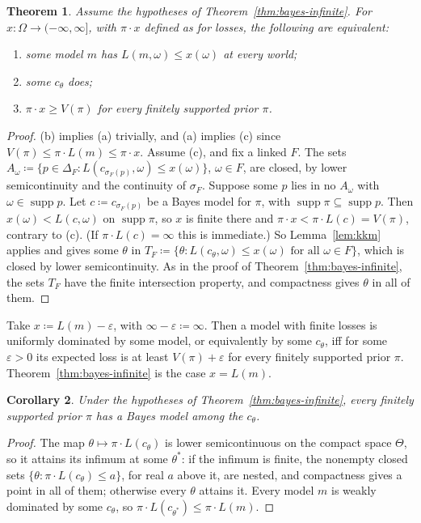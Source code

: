 \documentclass[11pt]{article}
\newtheorem{theorem}{Theorem}[section]
\newtheorem{corollary}[theorem]{Corollary}
\theoremstyle{definition}
\theoremstyle{remark}
\newcommand{\supp}{\operatorname{supp}}
\begin{document}
\begin{theorem}\label{thm:margin}
Assume the hypotheses of Theorem~\ref{thm:bayes-infinite}. For $x:\Omega\to(-\infty,\infty]$, with $\pi\cdot x$ defined as for losses, the following are equivalent:
\begin{enumerate}[label=(\alph*)]
\item some model $m$ has $L(m,\omega)\le x(\omega)$ at every world;
\item some $c_\theta$ does;
\item $\pi\cdot x\ge V(\pi)$ for every finitely supported prior $\pi$.
\end{enumerate}
\end{theorem}
\begin{proof}
(b) implies (a) trivially, and (a) implies (c) since $V(\pi)\le\pi\cdot L(m)\le\pi\cdot x$. Assume (c), and fix a linked $F$. The sets $A_\omega\coloneqq\{p\in\Delta_F:L(c_{\sigma_F(p)},\omega)\le x(\omega)\}$, $\omega\in F$, are closed, by lower semicontinuity and the continuity of $\sigma_F$. Suppose some $p$ lies in no $A_\omega$ with $\omega\in\supp p$. Let $c\coloneqq c_{\sigma_F(p)}$ be a Bayes model for $\pi$, with $\supp\pi\subseteq\supp p$. Then $x(\omega)<L(c,\omega)$ on $\supp\pi$, so $x$ is finite there and $\pi\cdot x<\pi\cdot L(c)=V(\pi)$, contrary to (c). (If $\pi\cdot L(c)=\infty$ this is immediate.) So Lemma~\ref{lem:kkm} applies and gives some $\theta$ in $T_F\coloneqq\{\theta:L(c_\theta,\omega)\le x(\omega)\text{ for all }\omega\in F\}$, which is closed by lower semicontinuity. As in the proof of Theorem~\ref{thm:bayes-infinite}, the sets $T_F$ have the finite intersection property, and compactness gives $\theta$ in all of them.
\end{proof}

Take $x\coloneqq L(m)-\varepsilon$, with $\infty-\varepsilon\coloneqq\infty$. Then a model with finite losses is uniformly dominated by some model, or equivalently by some $c_\theta$, iff for some $\varepsilon>0$ its expected loss is at least $V(\pi)+\varepsilon$ for every finitely supported prior $\pi$. Theorem~\ref{thm:bayes-infinite} is the case $x=L(m)$.

\begin{corollary}\label{cor:bayes-exist}
Under the hypotheses of Theorem~\ref{thm:bayes-infinite}, every finitely supported prior $\pi$ has a Bayes model among the $c_\theta$.
\end{corollary}
\begin{proof}
The map $\theta\mapsto\pi\cdot L(c_\theta)$ is lower semicontinuous on the compact space $\Theta$, so it attains its infimum at some $\theta^*$: if the infimum is finite, the nonempty closed sets $\{\theta:\pi\cdot L(c_\theta)\le a\}$, for real $a$ above it, are nested, and compactness gives a point in all of them; otherwise every $\theta$ attains it. Every model $m$ is weakly dominated by some $c_\theta$, so $\pi\cdot L(c_{\theta^*})\le\pi\cdot L(m)$.
\end{proof}
\end{document}
